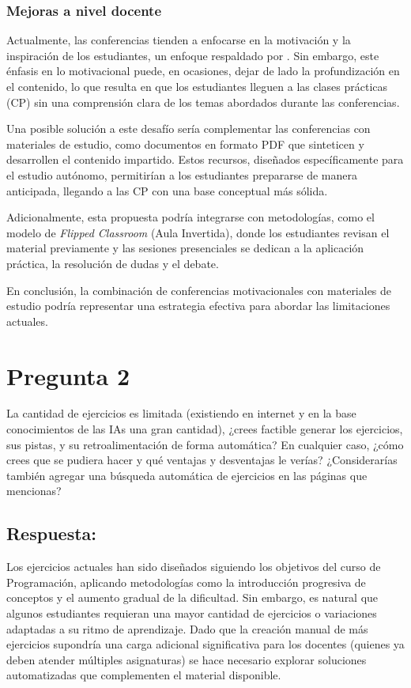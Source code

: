 \documentclass{article}
\begin{document}
\subsubsection{Mejoras a nivel docente}

Actualmente, las conferencias tienden a enfocarse en la motivación y la inspiración de los estudiantes, un enfoque respaldado por \cite{Jenkins2001}. Sin embargo, este énfasis en lo motivacional puede, en ocasiones, dejar de lado la profundización en el contenido, lo que resulta en que los estudiantes lleguen a las clases prácticas (CP) sin una comprensión clara de los temas abordados durante las conferencias.

Una posible solución a este desafío sería complementar las conferencias con materiales de estudio, como documentos en formato PDF que sinteticen y desarrollen el contenido impartido. Estos recursos, diseñados específicamente para el estudio autónomo, permitirían a los estudiantes prepararse de manera anticipada, llegando a las CP con una base conceptual más sólida.

Adicionalmente, esta propuesta podría integrarse con metodologías, como el modelo de \textit{Flipped Classroom} (Aula Invertida), donde los estudiantes revisan el material previamente y las sesiones presenciales se dedican a la aplicación práctica, la resolución de dudas y el debate.

En conclusión, la combinación de conferencias motivacionales con materiales de estudio podría representar una estrategia efectiva para abordar las limitaciones actuales.

\section{Pregunta 2}

La cantidad de ejercicios es limitada (existiendo en internet y en la base conocimientos de las IAs una gran cantidad), ¿crees factible generar los ejercicios, sus pistas, y su retroalimentación de forma automática? En cualquier caso, ¿cómo crees que se pudiera hacer y qué ventajas y desventajas le verías? ¿Considerarías también agregar una búsqueda automática de ejercicios en las páginas que mencionas?

\subsection{Respuesta:}  

Los ejercicios actuales han sido diseñados siguiendo los objetivos del curso de Programación, aplicando metodologías como la introducción progresiva de conceptos y el aumento gradual de la dificultad. Sin embargo, es natural que algunos estudiantes requieran una mayor cantidad de ejercicios o variaciones adaptadas a su ritmo de aprendizaje. Dado que la creación manual de más ejercicios supondría una carga adicional significativa para los docentes (quienes ya deben atender múltiples asignaturas) se hace necesario explorar soluciones automatizadas que complementen el material disponible.
\end{document}
